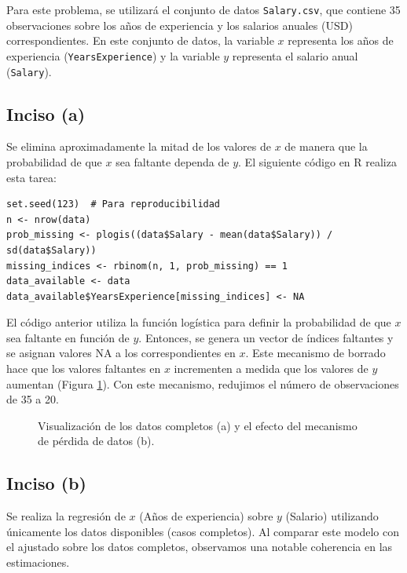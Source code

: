 \documentclass[paper=letter, fontsize=11pt, draft=false]{scrartcl}\usepackage[]{graphicx}\usepackage[]{xcolor}
\numberwithin{equation}{problemcounter} %
\numberwithin{figure}{problemcounter} %
\numberwithin{table}{problemcounter} %
\numberwithin{subsection}{problemcounter}
\begin{document}
Para este problema, se utilizará el conjunto de datos \texttt{Salary.csv}, que contiene 35 observaciones sobre los años de experiencia y los salarios anuales (USD) correspondientes. En este conjunto de datos, la variable $x$ representa los años de experiencia (\texttt{YearsExperience}) y la variable $y$ representa el salario anual (\texttt{Salary}).

\subsection{Inciso (a)}
Se elimina aproximadamente la mitad de los valores de $x$ de manera que la probabilidad de que $x$ sea faltante dependa de $y$. El siguiente código en R realiza esta tarea:

\begin{verbatim}
set.seed(123)  # Para reproducibilidad
n <- nrow(data)
prob_missing <- plogis((data$Salary - mean(data$Salary)) / sd(data$Salary))
missing_indices <- rbinom(n, 1, prob_missing) == 1
data_available <- data
data_available$YearsExperience[missing_indices] <- NA
\end{verbatim}

El código anterior utiliza la función logística para definir la probabilidad de que $x$ sea faltante en función de $y$. Entonces, se genera un vector de índices faltantes y se asignan valores NA a los correspondientes en $x$. Este mecanismo de borrado hace que los valores faltantes en $x$ incrementen a medida que los valores de $y$ aumentan (Figura \ref{fig:missing_data}). Con este mecanismo, redujimos el número de observaciones de 35 a 20.

\begin{figure}[H]
    \centering
    \begin{subfigure}[b]{0.48\textwidth}
        \centering
        \resizebox{\linewidth}{!}{}
        \caption{}
    \end{subfigure}
    \hfill
    \begin{subfigure}[b]{0.48\textwidth}
        \centering
        \resizebox{\linewidth}{!}{}
        \caption{}
    \end{subfigure}
    \caption{Visualización de los datos completos (a) y el efecto del mecanismo de pérdida de datos (b).}
    \label{fig:missing_data}
\end{figure}





\subsection{Inciso (b)}
Se realiza la regresión de $x$ (Años de experiencia) sobre $y$ (Salario) utilizando únicamente los datos disponibles (casos completos). Al comparar este modelo con el ajustado sobre los datos completos, observamos una notable coherencia en las estimaciones.
\end{document}
